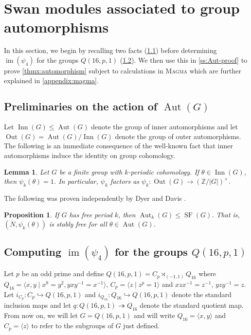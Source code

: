 \documentclass[11pt,leqno,a4paper]{amsart}
\newcommand{\Z}{\mathbb{Z}}
\DeclareMathOperator{\Aut}{Aut}
\DeclareMathOperator{\IM}{im}
\DeclareMathOperator{\Inn}{Inn}
\DeclareMathOperator{\Out}{Out}
\DeclareMathOperator{\SF}{SF}
\newtheorem{prop}[thm]{Proposition}
\newtheorem{lemma}[thm]{Lemma}
\theoremstyle{definition}
\theoremstyle{remark}
\theoremstyle{custom}
\begin{document}
\section{Swan modules associated to group automorphisms}
\label{s:Swan-module-automorphisms}

In this section, we begin by recalling two facts (\cref{ss:Aut-prelim}) before determining $\IM(\psi_4)$ for the groups $Q(16,p,1)$ (\cref{ss:Aut-out}). We then use this in \cref{ss:Aut-proof} to prove \cref{thmx:automorphism} subject to calculations in \textsc{Magma} which are further explained in \cref{appendix:magma}.

\subsection{Preliminaries on the action of $\Aut(G)$} \label{ss:Aut-prelim}

Let $\Inn(G) \le \Aut(G)$ denote the group of inner automorphisms and let $\Out(G) = \Aut(G)/\Inn(G)$ denote the group of outer automorphisms. The following is an immediate consequence of the well-known fact that inner automorphisms induce the identity on group cohomology.

\begin{lemma} \label{lemma:out}
Let $G$ be a finite group with $k$-periodic cohomology. If $\theta \in \Inn(G)$, then $\psi_k(\theta) = 1$. In particular, $\psi_k$ factors as $\psi_k : \Out(G) \to (\Z/|G|)^\times$. 
\end{lemma}

The following was proven independently by Dyer \cite[Note (b) p276]{Dy76} and Davis \cite{Da83}.

\begin{prop} \label{prop:davis-dyer}
If $G$ has free period $k$, then $\Aut_k(G) \le \SF(G)$. That is, $(N,\psi_k(\theta))$ is stably free for all $\theta \in \Aut(G)$.    
\end{prop}

\subsection{Computing $\IM(\psi_4)$ for the groups $Q(16,p,1)$} \label{ss:Aut-out}

Let $p$ be an odd prime and define $Q(16,p,1) = C_p \rtimes_{(-1,1)} Q_{16}$ where $Q_{16} = \langle x,y \mid x^8=y^2, yxy^{-1}=x^{-1}\rangle$, $C_p = \langle z \mid z^p=1 \rangle$ and $xzx^{-1}=z^{-1}$, $yzy^{-1}=z$.
Let $i_{C_p} : C_p \hookrightarrow Q(16,p,1)$ and $i_{Q_{16}} : Q_{16} \hookrightarrow Q(16,p,1)$ denote the standard inclusion maps and let $q : Q(16,p,1) \twoheadrightarrow Q_{16}$ denote the standard quotient map. 
From now on, we will let $G=Q(16,p,1)$ and will write $Q_{16} =\langle x,y \rangle$ and $C_p = \langle z \rangle$ to refer to the subgroups of $G$ just defined.
\end{document}
